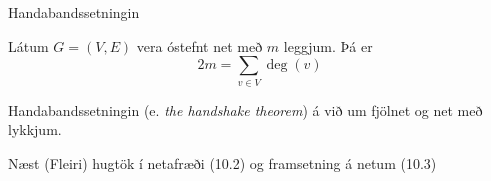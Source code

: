 \documentclass{beamer}
\begin{document}
\begin{frame}{Handabandssetningin}
\begin{tcolorbox}[title=Handabandssetningin]
Látum $G = (V, E)$ vera óstefnt net með $m$ leggjum. Þá er
\[
 2m = \sum_{v \in V} \deg(v)
\]
\end{tcolorbox}
Handabandssetningin (e. \emph{the handshake theorem}) á við um fjölnet og net með lykkjum.
\end{frame}

\begin{frame}{Næst}
(Fleiri) hugtök í netafræði (10.2) og framsetning á netum (10.3)
\end{frame}
\end{document}
